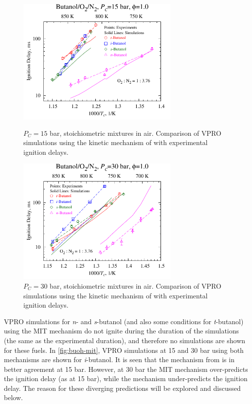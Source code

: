 \documentclass[12pt, letterpaper]{article}
\begin{document}
\begin{figure}
    \centering
    \begin{minipage}{0.45\textwidth}
        \includegraphics[width=8cm]{03-Butanol/buoh-15sim}
        \caption{$P_C=15$ bar, stoichiometric mixtures in air. Comparison of 
            VPRO simulations using the kinetic mechanism of 
            \textcite{Sarathy2012} with experimental ignition delays.}
        \label{fig:buoh-15sim}
    \end{minipage}
    \quad
    \begin{minipage}{0.45\textwidth}
        \includegraphics[width=8cm]{03-Butanol/buoh-30sim}
        \caption{$P_C=30$ bar, stoichiometric mixtures in air. Comparison of 
            VPRO simulations using the kinetic mechanism of 
            \textcite{Sarathy2012} with experimental ignition delays.}
        \label{fig:buoh-30sim}
    \end{minipage}
\end{figure}

VPRO simulations for \textit{n}- and \textit{s}-butanol (and also some
conditions for \textit{t}-butanol) using the MIT mechanism
\cite{Hansen2013,Merchant2013} do not ignite during the duration of the
simulations (the same as the experimental duration), and therefore no
simulations are shown for these fuels. In \autoref{fig:buoh-mit}, VPRO
simulations at 15 and 30 bar using both mechanisms are shown for
\textit{i}-butanol. It is seen that the mechanism from \textcite{Sarathy2012}
is in better agreement at 15 bar. However, at 30 bar the MIT mechanism
\cite{Hansen2013,Merchant2013} over-predicts the ignition delay (as at 15 bar),
while the \textcite{Sarathy2012} mechanism under-predicts the ignition delay.
The reason for these diverging predictions will be explored and discussed below.
\end{document}
